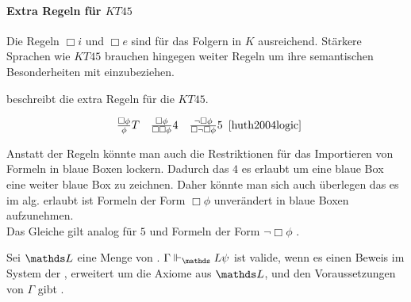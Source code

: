 \paragraph{Extra Regeln für $KT45$} %
\label{par:extra_regeln_fuer_kt45_}
Die Regeln $\Box i$ und $\Box e$ sind für das Folgern in $K$ ausreichend.
Stärkere Sprachen wie $KT45$ brauchen hingegen weiter Regeln um ihre semantischen Besonderheiten mit einzubeziehen. 

 beschreibt die extra Regeln für die \ML $KT45$.

\begin{equation}
	\label{eq:kt45_deduc_rules}
	\begin{array}{ccc}
		\frac{\Box \phi}
		{\phi} T&
		
		\frac{\Box \phi}
		{\Box \Box \phi} 4&
		
		\frac{\neg \Box \phi}
		{\Box \neg \Box \phi} 5
	\end{array}
	\citeHuth{S. 330}
\end{equation}

Anstatt der Regeln könnte man auch die Restriktionen für das Importieren von Formeln in blaue Boxen lockern.
Dadurch das $4$ es erlaubt um eine blaue Box eine weiter blaue Box zu zeichnen.
Daher könnte man sich auch überlegen das es im alg. erlaubt ist Formeln der Form $\Box \phi$ unverändert in blaue Boxen aufzunehmen.\\
Das Gleiche gilt analog für $5$ und Formeln der Form $\neg \Box \phi$ .

\begin{definition}
	Sei $\Menge{L}$ eine Menge von \formelSchemata. 
	$\Gamma
	\Vdash_\Menge{L} \psi$ ist valide, wenn es einen Beweis im 
	\ND System der 
	\NML, erweitert um die Axiome aus 
	$\Menge{L}$, und den Voraussetzungen von 
	$\Gamma$ gibt \cite[S.330]{huth2004logic}.
\end{definition}



